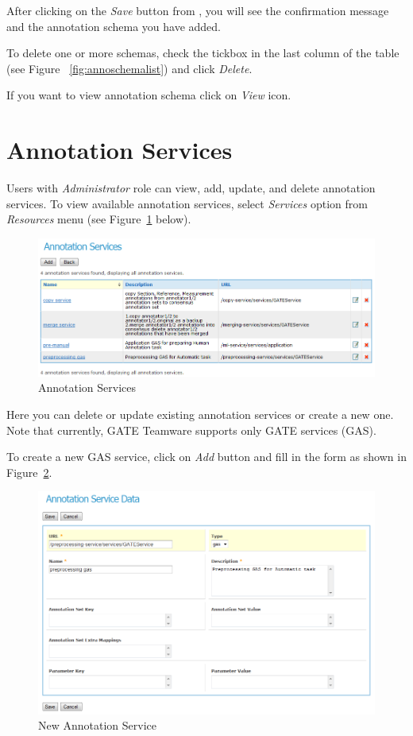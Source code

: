 After clicking on the \emph{Save} button from , you will see
the confirmation message and the annotation schema you have added.

To delete one or more schemas, check the tickbox in the last column of the 
table (see Figure ~\ref{fig:annoschemalist})  and click \emph{Delete}. 

If you want to view annotation schema click on \emph{View} icon.

\section{Annotation Services}
Users with \emph{Administrator} role can view, add, update, and delete
annotation services. To view available annotation services, select
\emph{Services} option from \emph{Resources} menu
(see Figure~\ref{fig:annotationservices} below).
\begin{figure}[hb!]
\centering
\includegraphics[scale=0.4]{annotationservices}
\caption{Annotation Services}
\label{fig:annotationservices}
\end{figure}

Here you can delete or update existing annotation services or create a new one.
Note that currently, GATE Teamware supports only GATE services (GAS).

To create a new GAS service, click on \emph{Add} button and fill in the form as
shown in Figure~\ref{fig:createannotationservice}.
\begin{figure}[hb!]
\centering
\includegraphics[scale=0.38]{createannotationservice}
\caption{New Annotation Service}
\label{fig:createannotationservice}
\end{figure}

